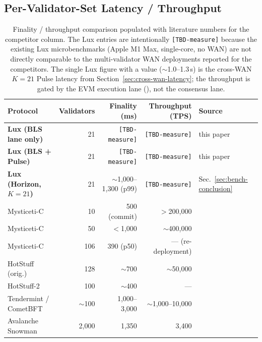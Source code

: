\subsection{Per-Validator-Set Latency / Throughput}

\begin{table}[h]
\centering
\small
\begin{tabular}{@{}lrrrl@{}}
\toprule
\textbf{Protocol} & \textbf{Validators} & \textbf{Finality (ms)} & \textbf{Throughput (TPS)} & \textbf{Source} \\
\midrule
\textbf{Lux (BLS lane only)}     & 21         & \texttt{[TBD-measure]} & \texttt{[TBD-measure]} & this paper \\
\textbf{Lux (BLS + Pulse)}       & 21         & \texttt{[TBD-measure]} & \texttt{[TBD-measure]} & this paper \\
\textbf{Lux (Horizon, $K{=}21$)} & 21         & $\sim$1{,}000--1{,}300 (p99) & \texttt{[TBD-measure]} & Sec.~\ref{sec:bench-conclusion} \\
\midrule
Mysticeti-C                      & 10         & 500 (commit)           & $>$200{,}000           & \cite[Fig.~5]{babel2024mysticeti} \\
Mysticeti-C                      & 50         & $<$1{,}000             & $\sim$400{,}000        & \cite[Fig.~6]{babel2024mysticeti} \\
Mysticeti-C                      & 106        & 390 (p50)              & --- (re-deployment)    & \cite[\S6.3]{babel2024mysticeti} \\
HotStuff (orig.)                 & 128        & $\sim$700              & $\sim$50{,}000         & \cite[\S5.3]{yin2019hotstuff} \\
HotStuff-2                       & 100        & $\sim$400              & ---                    & \cite[\S6]{malkhi2023hotstuff2} \\
Tendermint / CometBFT            & $\sim$100  & 1{,}000--3{,}000       & $\sim$1{,}000--10{,}000 & \cite{cometbftgithub,alqahtani2021bottlenecks} \\
Avalanche Snowman                & 2{,}000    & 1{,}350                & 3{,}400                & \cite[Table~5]{rocket2019avalanche} \\
\bottomrule
\end{tabular}
\caption{Finality / throughput comparison populated with literature numbers
for the competitor column. The Lux entries are intentionally \texttt{[TBD-measure]}
because the existing Lux microbenchmarks (Apple M1 Max, single-core, no WAN)
are not directly comparable to the multi-validator WAN deployments reported
for the competitors. The single Lux figure with a value
($\sim$1.0--1.3\,s) is the cross-WAN $K{=}21$ Pulse latency from
Section~\ref{sec:cross-wan-latency}; the throughput is gated by the EVM
execution lane (\cite{luxevmgpu}), not the consensus lane.}
\label{tab:pq-consensus-named}
\end{table}


